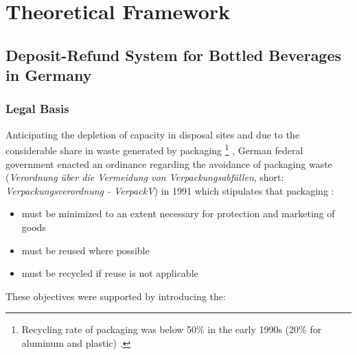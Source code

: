 
\chapter{Theoretical Framework}
\label{chp:theoreticalFramework}

\section{Deposit-Refund System for Bottled Beverages in Germany}
\subsection{Legal Basis}
\label{sec:legalBasis}
Anticipating the depletion of capacity in disposal sites and due to the considerable share in waste generated by packaging \footnote{Recycling rate of packaging was below 50\% in the early 1990s (20\% for aluminum and plastic)  \cite[p.~2]{Hartlep2011Recycling}.} \cite[p.~2]{Hartlep2011Recycling}, German federal government enacted an ordinance regarding the avoidance of packaging waste (\textit{Verordnung über die Vermeidung von Verpackungsabfällen}, short: \textit{Verpackungsverordnung - VerpackV}) in 1991 which stipulates that packaging \cite[§~1]{verpackV1991}:

\begin{itemize}
  \item must be minimized to an extent necessary for protection and marketing of goods
  \item must be reused where possible
  \item must be recycled if reuse is not applicable 
\end{itemize}

These objectives were supported by introducing the:


